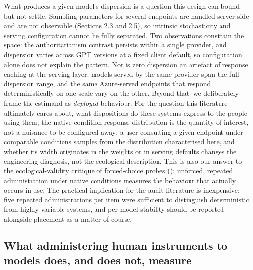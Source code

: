 \documentclass[
]{article}
\begin{document}
What produces a given model's dispersion is a question this design can
bound but not settle. Sampling parameters for several endpoints are
handled server-side and are not observable (Sections 2.3 and 2.5), so
intrinsic stochasticity and serving configuration cannot be fully
separated. Two observations constrain the space: the authoritarianism
contrast persists within a single provider, and dispersion varies across
GPT versions at a fixed client default, so configuration alone does not
explain the pattern. Nor is zero dispersion an artefact of response
caching at the serving layer: models served by the same provider span
the full dispersion range, and the same Azure-served endpoints that
respond deterministically on one scale vary on the other. Beyond that,
we deliberately frame the estimand as \emph{deployed} behaviour. For the
question this literature ultimately cares about, what dispositions do
these systems express to the people using them, the native-condition
response distribution is the quantity of interest, not a nuisance to be
configured away: a user consulting a given endpoint under comparable
conditions samples from the distribution characterised here, and whether
its width originates in the weights or in serving defaults changes the
engineering diagnosis, not the ecological description. This is also our
answer to the ecological-validity critique of forced-choice probes
(): unforced, repeated
administration under native conditions measures the behaviour that
actually occurs in use. The practical implication for the audit
literature is inexpensive: five repeated administrations per item were
sufficient to distinguish deterministic from highly variable systems,
and per-model stability should be reported alongside placement as a
matter of course.

\subsection{What administering human instruments to models does, and
does not,
measure}\label{what-administering-human-instruments-to-models-does-and-does-not-measure}
\end{document}
